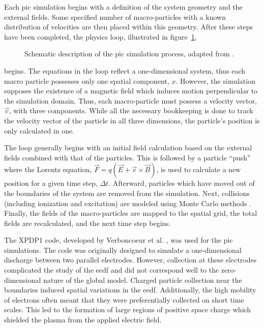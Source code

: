 Each \acs{pic} simulation begins with a definition of the system geometry and
the external fields. Some specified number of macro-particles with a known
distribution of velocities are then placed within this geometry. After these
steps have been completed, the physics loop, illustrated in
figure~\ref{fig:pic},
\begin{figure}
  \centering
  
  \caption{Schematic description of the \acs{pic} simulation process, adapted
    from \cite{Birdsall1991}.}
  \label{fig:pic}
\end{figure}
begins. The equations in the loop reflect a one-dimensional system, thus each
macro particle possesses only one spatial component, $x$. However, the
simulation supposes the existence of a magnetic field which induces motion
perpendicular to the simulation domain. Thus, each macro-particle must possess a
velocity vector, $\vec{v}$, with three components. While all the necessary
bookkeeping is done to track the velocity vector of the particle in all three
dimensions, the particle's position is only calculated in one.

The loop generally begins with an initial field calculation based on the
external fields combined with that of the particles. This is followed by a
particle ``push'' where the Lorentz equation, $\vec{F} = q(\vec{E} +
\vec{v}\times\vec{B})$, is used to calculate a new position for a given time
step, $\Delta t$. Afterward, particles which have moved out of the boundaries of
the system are removed from the simulation. Next, collisions (including
ionization and excitation) are modeled using Monte Carlo methods
\cite{Birdsall1991}. Finally, the fields of the macro-particles are mapped to
the spatial grid, the total fields are recalculated, and the next time step
begins.

The XPDP1 code, developed by Verboncoeur et al. \cite{Verboncoeur1993}, was used
for the \acs{pic} simulations. The code was originally designed to simulate a
one-dimensional discharge between two parallel electrodes. However, collection
at these electrodes complicated the study of the \acs{eedf} and did not
correspond well to the zero-dimensional nature of the global model. Charged
particle collection near the boundaries induced spatial variations in the
\acs{eedf}. Additionally, the high mobility of electrons often meant that they
were preferentially collected on short time scales. This led to the formation
of large regions of positive space charge which shielded the plasma from the
applied electric field.

